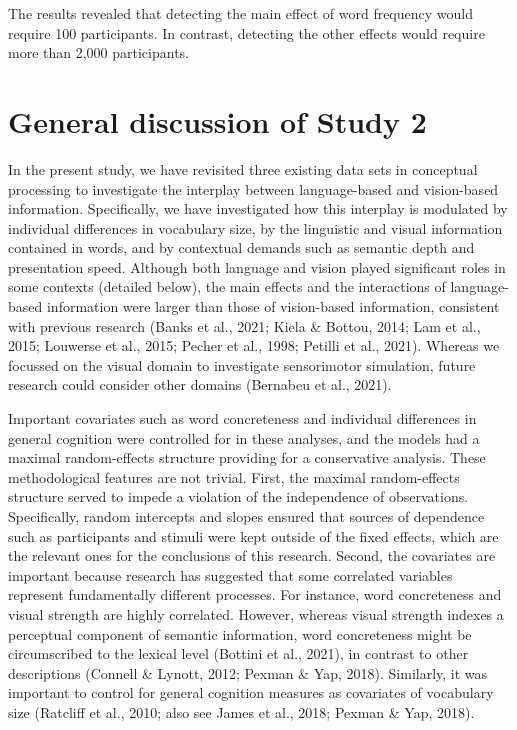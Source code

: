 \documentclass[
  12pt,
  man,floatsintext]{apa7}
\begin{document}
The results revealed that detecting the main effect of word frequency would require 100 participants. In contrast, detecting the other effects would require more than 2,000 participants.

\hypertarget{general-discussion-of-study-2}{%
\section{General discussion of Study 2}\label{general-discussion-of-study-2}}

In the present study, we have revisited three existing data sets in conceptual processing to investigate the interplay between language-based and vision-based information. Specifically, we have investigated how this interplay is modulated by individual differences in vocabulary size, by the linguistic and visual information contained in words, and by contextual demands such as semantic depth and presentation speed. Although both language and vision played significant roles in some contexts (detailed below), the main effects and the interactions of language-based information were larger than those of vision-based information, consistent with previous research (Banks et al., 2021; Kiela \& Bottou, 2014; Lam et al., 2015; Louwerse et al., 2015; Pecher et al., 1998; Petilli et al., 2021). Whereas we focussed on the visual domain to investigate sensorimotor simulation, future research could consider other domains (Bernabeu et al., 2021).

Important covariates such as word concreteness and individual differences in general cognition were controlled for in these analyses, and the models had a maximal random-effects structure providing for a conservative analysis. These methodological features are not trivial. First, the maximal random-effects structure served to impede a violation of the independence of observations. Specifically, random intercepts and slopes ensured that sources of dependence such as participants and stimuli were kept outside of the fixed effects, which are the relevant ones for the conclusions of this research. Second, the covariates are important because research has suggested that some correlated variables represent fundamentally different processes. For instance, word concreteness and visual strength are highly correlated. However, whereas visual strength indexes a perceptual component of semantic information, word concreteness might be circumscribed to the lexical level (Bottini et al., 2021), in contrast to other descriptions (Connell \& Lynott, 2012; Pexman \& Yap, 2018). Similarly, it was important to control for general cognition measures as covariates of vocabulary size (Ratcliff et al., 2010; also see James et al., 2018; Pexman \& Yap, 2018).
\end{document}
